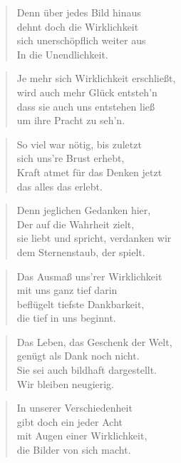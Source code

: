 \documentclass[10pt,a4paper]{article}
\begin{document}
\begin{paracol}{2}
\begin{verse}
Denn über jedes Bild hinaus \\
dehnt doch die Wirklichkeit \\
sich unerschöpflich weiter aus \\
In die Unendlichkeit. \\
\end{verse}

\begin{verse}
Je mehr sich Wirklichkeit erschließt, \\
wird auch mehr Glück entsteh’n \\
dass sie auch uns entstehen ließ \\
um ihre Pracht zu seh’n. \\
\end{verse}

\begin{verse}
So viel war nötig, bis zuletzt \\
sich uns’re Brust erhebt, \\
Kraft atmet für das Denken jetzt \\
das alles das erlebt. \\
\end{verse}

\begin{verse}
Denn jeglichen Gedanken hier, \\
Der auf die Wahrheit zielt, \\
sie liebt und spricht, verdanken wir \\
dem Sternenstaub, der spielt. \\
\end{verse}

\begin{verse}
Das Ausmaß uns’rer Wirklichkeit \\
mit uns ganz tief darin \\
beflügelt tiefste Dankbarkeit, \\
die tief in uns beginnt. \\
\end{verse}

\begin{verse}
Das Leben, das Geschenk der Welt, \\
genügt als Dank noch nicht. \\
Sie sei auch bildhaft dargestellt. \\
Wir bleiben neugierig. \\
\end{verse}

\begin{verse}
In unserer Verschiedenheit \\
gibt doch ein jeder Acht \\
mit Augen einer Wirklichkeit, \\
die Bilder von sich macht. \\
\end{verse}

\end{paracol}
\end{document}
